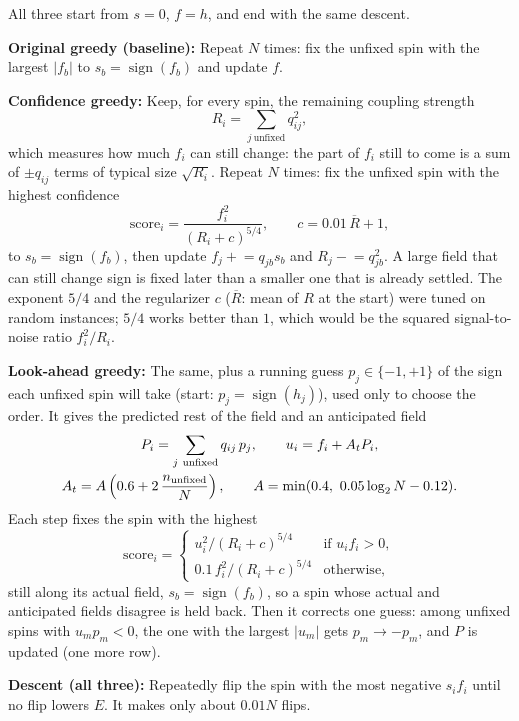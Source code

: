 \documentclass[11pt]{article}
\begin{document}
All three start from $s = 0$, $f = h$, and end with the same descent.

\noindent\textbf{Original greedy (baseline):} Repeat $N$ times: fix the unfixed spin with the largest $|f_b|$ to
$s_b = \operatorname{sign}(f_b)$ and update $f$.

\noindent\textbf{Confidence greedy:} Keep, for every spin, the remaining coupling strength
\[
  R_i = \sum_{j\ \text{unfixed}} q_{ij}^2 ,
\]
which measures how much $f_i$ can still change: the part of $f_i$ still to come is a sum of $\pm q_{ij}$ terms of
typical size $\sqrt{R_i}$. Repeat $N$ times: fix the unfixed spin with the highest confidence
\[
  \text{score}_i = \frac{f_i^2}{(R_i + c)^{5/4}}, \qquad c = 0.01\,\overline{R} + 1,
\]
to $s_b = \operatorname{sign}(f_b)$, then update $f_j \mathrel{+}= q_{jb} s_b$ and $R_j \mathrel{-}= q_{jb}^2$.
A large field that can still change sign is fixed later than a smaller one that is already settled. The exponent $5/4$
and the regularizer $c$ ($\overline{R}$: mean of $R$ at the start) were tuned on random instances; $5/4$ works better
than $1$, which would be the squared signal-to-noise ratio $f_i^2/R_i$.

\noindent\textbf{Look-ahead greedy:} The same, plus a running guess $p_j \in \{-1,+1\}$ of the sign each unfixed spin
will take (start: $p_j = \operatorname{sign}(h_j)$), used only to choose the order. It gives the predicted rest of the
field and an anticipated field
\[
  \begin{gathered}
  P_i = \sum_{j\ \text{unfixed}} q_{ij}\, p_j, \qquad u_i = f_i + A_t P_i, \\
  A_t = A\left(0.6 + 2\,\frac{n_{\rm unfixed}}{N}\right), \qquad A = \min(0.4,\ 0.05\log_2 N - 0.12).
  \end{gathered}
\]
Each step fixes the spin with the highest
\[
  \text{score}_i =
  \begin{cases}
    u_i^2/(R_i+c)^{5/4} & \text{if } u_i f_i > 0,\\
    0.1\, f_i^2/(R_i+c)^{5/4} & \text{otherwise},
  \end{cases}
\]
still along its actual field, $s_b = \operatorname{sign}(f_b)$, so a spin whose actual and anticipated fields disagree is
held back. Then it corrects one guess: among unfixed spins with $u_m p_m < 0$, the one with the largest $|u_m|$ gets
$p_m \to -p_m$, and $P$ is updated (one more row).

\noindent\textbf{Descent (all three):} Repeatedly flip the spin with the most negative $s_i f_i$ until no flip lowers
$E$. It makes only about $0.01N$ flips.
\end{document}
